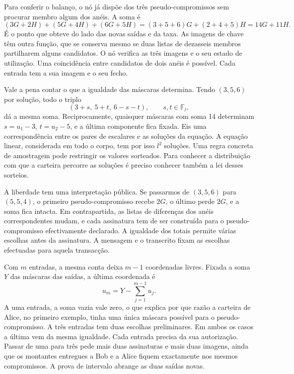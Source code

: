 Para conferir o balanço, o nó já dispõe dos três
pseudo-compromissos sem procurar membro algum dos anéis. A soma é
\[
 (3G+2H)+(5G+4H)+(6G+5H)
      =(3+5+6)G+(2+4+5)H=14G+11H .
\]
É o ponto que obteve do lado das novas saídas e da taxa. As imagens
de chave têm outra função, que se conserva mesmo se duas listas de
dezasseis membros partilharem alguns candidatos. O nó verifica as
três imagens e o seu estado de utilização. Uma coincidência entre
candidatos de dois anéis é possível. Cada entrada tem a sua imagem
e o seu fecho.

Vale a pena contar o que a igualdade das máscaras determina.
Tendo \((3,5,6)\) por solução, todo o triplo
\[
                  (3+s,\ 5+t,\ 6-s-t),\qquad
                  s,t\in\mathbb F_l ,
\]
dá a mesma soma. Reciprocamente, quaisquer máscaras com soma 14
determinam \(s=u_1-3\), \(t=u_2-5\), e a última componente fica
fixada. Eis uma correspondência entre os pares de escalares e as
soluções da equação. A equação linear, considerada em todo o corpo,
tem por isso \(l^2\) soluções. Uma regra concreta de amostragem
pode restringir os valores sorteados. Para conhecer a distribuição
com que a carteira percorre as soluções é preciso conhecer também
a lei desses sorteios.

A liberdade tem uma interpretação pública. Se passarmos de
\((3,5,6)\) para \((5,5,4)\), o primeiro pseudo-compromisso recebe
\(2G\), o último perde \(2G\), e a soma fica intacta. Em contrapartida,
as listas de diferenças dos anéis correspondentes mudam, e cada
assinatura tem de ser construída para o pseudo-compromisso efectivamente
declarado. A igualdade dos totais permite várias escolhas antes da
assinatura. A mensagem e o transcrito fixam as escolhas efectuadas
para aquela transacção.

Com \(m\) entradas, a mesma conta deixa \(m-1\) coordenadas livres.
Fixada a soma \(Y\) das máscaras das saídas, a última coordenada é
\[
                 u_m=Y-\sum_{j=1}^{m-1}u_j .
\]
A uma entrada, a soma vazia vale zero, o que explica por que razão a
carteira de Alice, no primeiro exemplo, tinha uma única máscara possível para
o pseudo-compromisso. A três entradas tem duas escolhas preliminares.
Em ambos os casos a última vem da mesma igualdade. Cada entrada
precisa da sua autorização. Passar de uma para três pede
mais duas assinaturas e mais duas imagens, ainda que os montantes
entregues a Bob e a Alice fiquem exactamente nos mesmos compromissos.
A prova de intervalo abrange as duas saídas novas.
